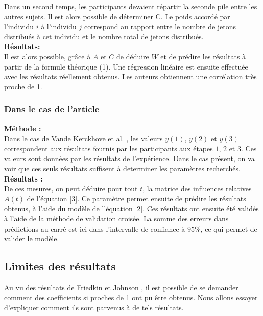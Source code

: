 \documentclass{scrreprt}
\begin{document}
\begin{multicols}{2}
Dans un second temps, les participants devaient répartir la seconde pile entre les autres sujets. Il est alors possible de déterminer C. Le poids accordé par l'individu $i$ à l'individu $j$ correspond au rapport entre le nombre de jetons distribués à cet individu et le nombre total de jetons distribués.\\

\textbf{Résultats:}\\

Il est alors possible, grâce à $A$ et $C$ de déduire $W$ et de prédire les résultats à partir de la formule théorique (1). Une régression linéaire est ensuite effectuée avec les résultats réellement obtenus. Les auteurs obtiennent une corrélation très proche de 1.
 
\subsubsection{Dans le cas de l'article \cite{VMG}}

\textbf{Méthode :} \\

Dans le cas de Vande Kerckhove et al. \cite{VMG}, les valeurs $y(1)$, $y(2)$ et $y(3)$ correspondent aux résultats fournis par les participants aux étapes $1$, $2$ et $3$. Ces valeurs sont données par les résultats de l'expérience. Dans le cas présent, on va voir que ces seuls résultats suffisent à determiner les paramètres recherchés.\\

\textbf{Résultats :} \\

De ces mesures, on peut déduire pour tout $t$, la matrice des influences relatives $A(t)$ de l'équation \eqref{3}. Ce paramètre permet ensuite de prédire les résultats obtenus, à l'aide du modèle de l'équation \eqref{2}. Ces résultats ont ensuite été validés à l'aide de la méthode de validation croisée. La somme des erreurs dans prédictions au carré est ici dans l'intervalle de confiance à $95\%$, ce qui permet de valider le modèle.\\

\subsection{Limites des résultats}

Au vu des résultats de Friedkin et Johnson \cite{FJ}, il est possible de se demander comment des coefficients si proches de 1 ont pu être obtenus. Nous allons essayer d'expliquer comment ils sont parvenus à de tels résultats.\\


\end{multicols}
\end{document}
